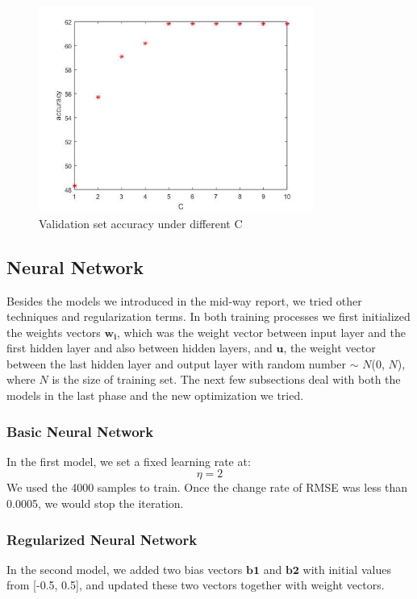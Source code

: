 \documentclass{article} %
\begin{document}
\begin{figure}[ht!]
	\centering
	\includegraphics[width=90mm]{C.jpg}
	\caption{Validation set accuracy under different C\label{figure2}}
\end{figure}

\subsection{Neural Network}
Besides the models we introduced in the mid-way report, we tried other techniques and regularization terms. In both training processes we first initialized the weights vectors $\mathbf{w_i}$, which was the weight vector between input layer and the first hidden layer and also between hidden layers, and $\mathbf{u}$, the weight vector between the last hidden layer and output layer with random number $\sim$ $N$(0, $N$), where $N$ is the size of training set. The next few subsections deal with both the models in the last phase and the new optimization we tried.
\subsubsection{Basic Neural Network}
In the first model, we set a fixed learning rate at:
\begin{equation}
\eta = 2
\end{equation}
We used the 4000 samples to train. Once the change rate of RMSE was less than 0.0005, we would stop the iteration. 

\subsubsection{Regularized Neural Network}
In the second model, we added two bias vectors $\mathbf{b1}$ and  $\mathbf{b2}$ with initial values from [-0.5, 0.5], and updated these two vectors together with weight vectors. 
\end{document}
